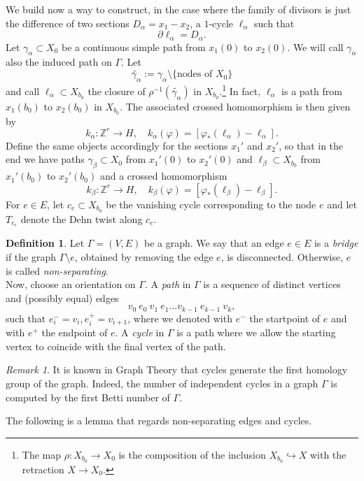 \documentclass[a4paper,12 pt,titlepage,twoside]{book}
\newcommand{\numberset}{\mathbb}
\newcommand{\Z}{\numberset{Z}}
\theoremstyle{plain}
\theoremstyle{theorem}
\theoremstyle{definition}
\newtheorem{defn}[thm]{Definition}
\theoremstyle{remark}
\newtheorem{oss}[thm]{Remark}
\begin{document}
	We build now a way to construct, in the case where the family of divisors is just the difference of two sections $D_\alpha = x_1 - x_2$, a $1$-cycle $\ell_\alpha$ such that $$\partial \ell_\alpha = D_\alpha.$$ Let $\gamma_\alpha \subset X_0$ be a continuous simple path from $x_1(0)$ to $x_2(0)$. We will call $\gamma_\alpha$ also the induced path on $\Gamma.$ Let $$\widetilde{\gamma_\alpha}:= \gamma_\alpha \setminus \{\text{nodes of } X_0\}$$ and call $\ell_\alpha \subset X_{b_0}$ the closure of $\rho^{-1}(\widetilde{\gamma_\alpha})$ in $X_{b_0}$.\footnote{The map $\rho \colon X_{b_0} \rightarrow X_0$ is the composition of the inclusion $X_{b_0} \hookrightarrow X$ with the retraction $X \rightarrow X_0.$} In fact, $\ell_\alpha$ is a path from $x_1(b_0)$ to $x_2(b_0)$ in $X_{b_0}.$ The associated crossed homomorphism is then given by $$k_\alpha \colon \Z^r \rightarrow H, \quad k_\alpha(\varphi) = [\varphi_*(\ell_\alpha) - \ell_\alpha].$$ Define the same objects accordingly for the sections $x_1'$ and $x_2'$, so that in the end we have paths $\gamma_\beta \subset X_0$ from $x_1'(0)$ to $x_2'(0)$ and $\ell_\beta \subset X_{b_0}$ from $x_1'(b_0)$ to $x_2'(b_0)$ and a crossed homomorphism $$k_\beta \colon \Z^r \rightarrow H, \quad k_\beta(\varphi) = [\varphi_*(\ell_\beta) - \ell_\beta].$$
	For $e \in E$, let $c_e \subset X_{b_0}$ be the vanishing cycle corresponding to the node $e$ and let $T_{c_e}$ denote the Dehn twist along $c_e.$
	\begin{defn}
		Let $\Gamma= (V,E)$ be a graph. We say that an edge $e \in E$ is a \emph{bridge} if the graph $\Gamma \setminus e$, obtained by removing the edge $e$, is disconnected. Otherwise, $e$ is called \emph{non-separating}.\\
		Now, choose an orientation on $\Gamma.$	A \emph{path} in $\Gamma$ is a sequence of distinct vertices and (possibly equal) edges $$v_0\ e_0\ v_1\ e_1 \dots v_{k-1}\ e_{k-1}\ v_k,$$ such that $e_i^-=v_i, e_i^+ = v_{i+1}$, where we denoted with $e^-$ the startpoint of $e$ and with $e^+$ the endpoint of $e$. A \emph{cycle} in $\Gamma$ is a path where we allow the starting vertex to coincide with the final vertex of the path.
	\end{defn}
	\begin{oss}
		It is known in Graph Theory that cycles generate the first homology group of the graph. Indeed, the number of independent cycles in a graph $\Gamma$ is computed by the first Betti number of $\Gamma$.
	\end{oss}
	The following is a lemma that regards non-separating edges and cycles.
\end{document}
